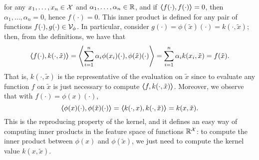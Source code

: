 for any $x_1, \ldots, x_n \in \mathcal{X}$ and $\alpha_1, \ldots, \alpha_n \in \mathbb{R}$, and if $\bm{\left\langle} f(\cdot), f(\cdot) \bm{\right\rangle} = 0$, then $\alpha_1, \ldots, \alpha_n =0$, hence $f(\cdot) = 0$.
%
This inner product is defined for any pair of functions $f(\cdot), g(\cdot) \in \mathcal{V}_\phi$. In particular, consider $g(\cdot) = \phi(\tilde{x})(\cdot) = k(\cdot, \tilde{x})$; then, from the definitions, we have that
$$ \bm{\left\langle} f(\cdot), k(\cdot, \tilde{x}) \bm{\right\rangle} = \bm{\left\langle} \sum_{i=1}^n \alpha_i \phi(x_i)(\cdot), \phi(\tilde{x})(\cdot) \bm{\right\rangle}  =\sum_{i=1}^n \alpha_i k(x_i, \tilde{x}) = f(\tilde{x}) .$$
That is, $k(\cdot, \tilde{x})$ is the representative of the evaluation on $\tilde{x}$ since to evaluate any function $f$ on $\tilde{x}$ is just necessary to compute $\bm{\left\langle} f, k(\cdot, \tilde{x}) \bm{\right\rangle}$. Moreover, we observe that with $f(\cdot) = \phi(x)(\cdot)$,
$$ \bm{\left\langle} \phi(x)(\cdot), \phi(\tilde{x})(\cdot) \bm{\right\rangle} = \bm{\left\langle} k(\cdot, x), k(\cdot, \tilde{x}) \bm{\right\rangle} = k(x, \tilde{x}) .$$  
This is the reproducing property of the kernel, and it defines an easy way of computing inner products in the feature space of functions $\mathbb{R}^{\mathcal{X}}$: to compute the inner product between $\phi(x)$ and $\phi(\tilde{x})$, we just need to compute the kernel value $k(x, \tilde{x})$.

